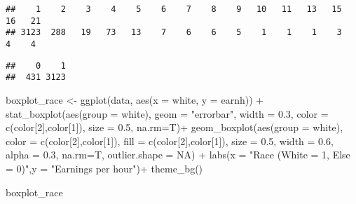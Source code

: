 \documentclass[
]{article}
\newenvironment{Shaded}{\begin{snugshade}}{\end{snugshade}}
\newcommand{\AttributeTok}[1]{\textcolor[rgb]{0.77,0.63,0.00}{#1}}
\newcommand{\ConstantTok}[1]{\textcolor[rgb]{0.00,0.00,0.00}{#1}}
\newcommand{\DecValTok}[1]{\textcolor[rgb]{0.00,0.00,0.81}{#1}}
\newcommand{\FloatTok}[1]{\textcolor[rgb]{0.00,0.00,0.81}{#1}}
\newcommand{\FunctionTok}[1]{\textcolor[rgb]{0.00,0.00,0.00}{#1}}
\newcommand{\NormalTok}[1]{#1}
\newcommand{\OtherTok}[1]{\textcolor[rgb]{0.56,0.35,0.01}{#1}}
\newcommand{\SpecialCharTok}[1]{\textcolor[rgb]{0.00,0.00,0.00}{#1}}
\newcommand{\StringTok}[1]{\textcolor[rgb]{0.31,0.60,0.02}{#1}}
\begin{document}
\begin{verbatim}
##    1    2    3    4    5    6    7    8    9   10   11   13   15   16   21 
## 3123  288   19   73   13    7    6    6    5    1    1    1    3    4    4
\end{verbatim}

\begin{Shaded}
\end{Shaded}

\begin{verbatim}
##    0    1 
##  431 3123
\end{verbatim}

\begin{Shaded}
\begin{Highlighting}[]
\NormalTok{boxplot\_race }\OtherTok{\textless{}{-}} \FunctionTok{ggplot}\NormalTok{(data, }\FunctionTok{aes}\NormalTok{(}\AttributeTok{x =}\NormalTok{ white, }\AttributeTok{y =}\NormalTok{ earnh)) }\SpecialCharTok{+}
  \FunctionTok{stat\_boxplot}\NormalTok{(}\FunctionTok{aes}\NormalTok{(}\AttributeTok{group =}\NormalTok{ white), }\AttributeTok{geom =} \StringTok{"errorbar"}\NormalTok{, }\AttributeTok{width =} \FloatTok{0.3}\NormalTok{,}
               \AttributeTok{color =} \FunctionTok{c}\NormalTok{(color[}\DecValTok{2}\NormalTok{],color[}\DecValTok{1}\NormalTok{]), }\AttributeTok{size =} \FloatTok{0.5}\NormalTok{, }\AttributeTok{na.rm=}\NormalTok{T)}\SpecialCharTok{+}
  \FunctionTok{geom\_boxplot}\NormalTok{(}\FunctionTok{aes}\NormalTok{(}\AttributeTok{group =}\NormalTok{ white),}
               \AttributeTok{color =} \FunctionTok{c}\NormalTok{(color[}\DecValTok{2}\NormalTok{],color[}\DecValTok{1}\NormalTok{]), }\AttributeTok{fill =} \FunctionTok{c}\NormalTok{(color[}\DecValTok{2}\NormalTok{],color[}\DecValTok{1}\NormalTok{]),}
               \AttributeTok{size =} \FloatTok{0.5}\NormalTok{, }\AttributeTok{width =} \FloatTok{0.6}\NormalTok{, }\AttributeTok{alpha =} \FloatTok{0.3}\NormalTok{, }\AttributeTok{na.rm=}\NormalTok{T, }\AttributeTok{outlier.shape =} \ConstantTok{NA}\NormalTok{) }\SpecialCharTok{+}
  \FunctionTok{labs}\NormalTok{(}\AttributeTok{x =} \StringTok{"Race (White = 1, Else = 0)"}\NormalTok{,}\AttributeTok{y =} \StringTok{"Earnings per hour"}\NormalTok{)}\SpecialCharTok{+}
  \FunctionTok{theme\_bg}\NormalTok{()}

\NormalTok{boxplot\_race}
\end{Highlighting}
\end{Shaded}
\end{document}
